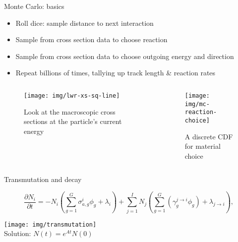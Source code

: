 \documentclass[pdf,aspectratio=169]{beamer}
\begin{document}
\begin{frame}{Monte Carlo: basics}
        \begin{itemize}
            \item Roll dice: sample distance to next interaction
            \item Sample from cross section data to choose reaction
            \item Sample from cross section data to choose outgoing energy and direction
            \item Repeat billions of times, tallying up track length \& reaction rates
        \end{itemize}
\begin{columns}
    \begin{column}{0.5\textwidth}
        \begin{figure}[ht]
        \centering
            \texttt{[image: img/lwr-xs-sq-line]}
            \caption{\tiny Look at the macroscopic cross sections at the particle's current energy} 
        \end{figure}
    \end{column}
    \begin{column}{0.5\textwidth}
        \begin{figure}[ht]
        \centering
            \texttt{[image: img/mc-reaction-choice]}
            \caption{\tiny A discrete CDF for material choice} 
        \end{figure}
    \end{column}
\end{columns}
\end{frame}

\begin{frame}{Transmutation and decay}

\begin{equation}
\frac{\partial N_{i}}{\partial t}=-N_{i}\left(\sum_{g=1}^{G}\sigma_{a,g}^{i}\phi_{g}+\lambda_{i}\right)+\sum_{j=1}^{I}N_{j}\left(\sum_{g=1}^{G}\left(\gamma_{g}^{j\rightarrow i}\phi_{g}\right)+\lambda_{j\rightarrow i}\right),\label{eq:transmutation_rates}
\end{equation}

    \begin{center}

    \texttt{[image: img/transmutation]}\\
    Solution: $N(t) = e^{A t} N(0)$
    \end{center}
\end{frame}
\end{document}
